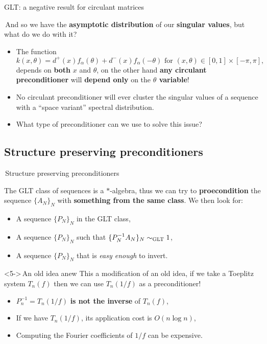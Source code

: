 \documentclass[aspectratio=169,xcolor=dvipsnames]{beamer}
\begin{document}
\begin{frame}{GLT: a negative result for circulant matrices}
	
\faQuestionCircle\,And so we have the \textbf{asymptotic distribution} of our \textbf{singular values}, but what do we do with it?

\begin{itemize}
	\item[\alert{\faExclamationCircle}]<2-> The function
	\[
	k(x,\theta) = d^+(x)f_\alpha(\theta) + d^-(x) f_\alpha(-\theta) \text{ for } (x,\theta) \in [0,1] \times [-\pi,\pi],
	\]
	depends on \textbf{both} $x$ and $\theta$, on the other hand \textbf{any circulant preconditioner} will \textbf{depend only} on the \textbf{$\theta$ variable}!
	\item[$\Rightarrow$]<3-> \alert{No circulant preconditioner will ever cluster} the singular values of \alert{a sequence with a ``space variant'' spectral distribution}.
	\item[\faQuestionCircle]<4> What type of preconditioner can we use to solve this issue?
\end{itemize}

\end{frame}

\subsection{Structure preserving preconditioners}

\begin{frame}{\faLightbulb\,Structure preserving preconditioners}

The GLT class of sequences is a $*$-algebra, thus we can try to \textbf{proecondition} the sequence $\{A_N\}_N$ with \textbf{something from the same class}. We then look for:

\begin{itemize}
	\item[\faHammer]<2-> A sequence $\{P_N\}_N$ in the GLT class,
	\item[\faHammer]<3-> A sequence $\{P_N\}_N$ such that $\{ P_N^{-1} A_N\}_N \sim_{\rm GLT} 1$, 
	\item[\faHammer]<4-> A sequence $\{P_N\}_N$ that is \emph{easy enough} to invert.
\end{itemize}

\begin{exampleblock}<5->{\faBookReader\,An old idea anew}
This a modification of an old idea, if we take a Toeplitz system $T_n(f)$ then we can use $T_n(1/f)$ as a preconditioner!
\begin{itemize}
	\item[\faMagic] $P_n^{-1} = T_n(1/f)$ \textbf{is not the inverse} of $T_n(f)$,
	\item[\faMagic] \alert<6>{If we have} $T_n(1/f)$, its application cost is $O(n \log n)$,
	\item[\faExclamationCircle]<6-> Computing the Fourier coefficients of $1/f$ can be expensive.
\end{itemize}
\end{exampleblock}

\end{frame}
\end{document}
